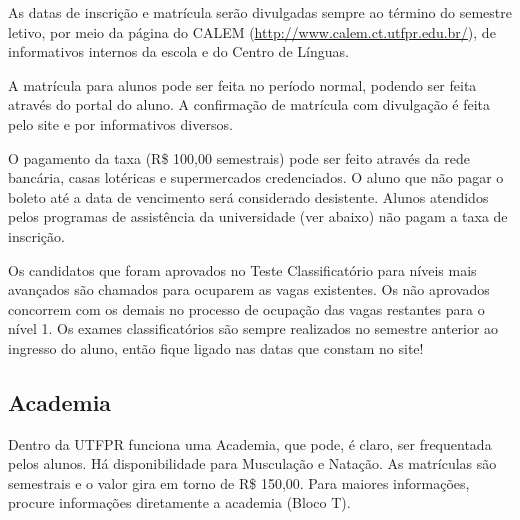 \documentclass[a4paper,12pt,openany]{article}
\begin{document}
As datas de inscrição e matrícula serão divulgadas sempre ao término do semestre letivo, por meio da página do CALEM (\url{http://www.calem.ct.utfpr.edu.br/}), de informativos internos da escola e do Centro de Línguas.

A matrícula para alunos pode ser feita no período normal, podendo ser feita através do portal do aluno. A confirmação de matrícula com divulgação é feita pelo site e por informativos diversos.

O pagamento da taxa (R\$ 100,00 semestrais) pode ser feito através da rede bancária, casas lotéricas e supermercados credenciados. O aluno que não pagar o boleto até a data de vencimento será considerado desistente. Alunos atendidos pelos programas de assistência da universidade (ver abaixo) não pagam a taxa de inscrição.

Os candidatos que foram aprovados no Teste Classificatório para níveis mais avançados são chamados para ocuparem as vagas existentes. Os não aprovados concorrem com os demais no processo de ocupação das vagas restantes para o nível 1. Os exames classificatórios são sempre realizados no semestre anterior ao ingresso do aluno, então fique ligado nas datas que constam no site!




\subsection{Academia}

Dentro da UTFPR funciona uma Academia, que pode, é claro, ser frequentada pelos alunos. Há disponibilidade para Musculação e Natação. As matrículas são semestrais e o valor gira em torno de R\$ 150,00. Para maiores informações, procure informações diretamente a academia (Bloco T).



\end{document}
